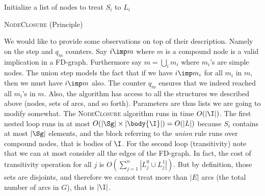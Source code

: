 \begin{algorithm}
	
	\BlankLine
	\BlankLine
	
	Initialize a list of nodes to treat $S_i$ to $L_i$ \;
	
	
	\caption{\textsc{NodeClosure} (Principle)}
	\label{alg:FD-NodeClosure-Principle}
\end{algorithm}

We would like to provide some observations on top of their description. Namely 
on the  step and $q_m$ counters. Say $i \imp m$ where $m$ is a 
compound node is a valid implication in a FD-graph. Furthermore say $m = 
\bigcup_i m_i$ where $m_i$'s are simple nodes. The union step models the fact 
that if we have $i \imp m_i$ for all $m_i$ in $m$, then we must have $i \imp m$ 
also. The counter $q_m$ ensures that we indeed reached all $m_i$'s in $m$. 
Also, the algorithm has access to all the structures we described above (nodes, 
sets of arcs, and so forth). Parameters are thus lists we are going to modify 
somewhat. The \textsc{NodeClosure} algorithm runs in time $O(|\I|)$. The first 
nested loop runs in at most $O(|\Sg| \times |\body{\I}|) = O(|L|)$ because 
$S_i$ contains at most $|\Sg|$ elements, and the block referring to the 
\textit{union} rule runs over compound nodes, that is bodies of $\I$. For the 
second loop (transitivity) note that we can at most consider all the edges of 
the FD-graph. In fact, the cost of transitivity operation for all $j$ is 
$O(\sum_{j = 1}^n |L_j^0 \cup L_j^1 |)$. But by definition, those sets are 
disjoints, and therefore we cannot treat more than $| E |$ arcs (the total 
number of arcs in $G$), that is $|\I|$.

